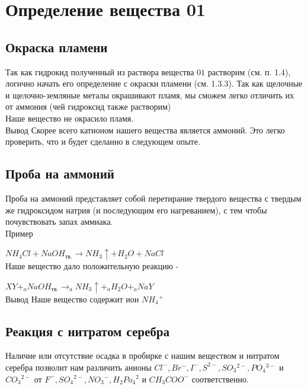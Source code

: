 \documentclass[a4paper,14pt,notitlepage,twoside]{article}
\begin{document}
    \newpage
    \section{Определение вещества 01}
        \subsection{Окраска пламени}
            Так как гидрокид полученный из раствора вещества $01$ растворим (см. п. 1.4),
            логично начать его определение с окраски пламени (см. 1.3.3). Так как щелочные
            и щелочно-земляные металы окрашивают пламя, мы сможем легко отличить их от 
            аммония (чей гидроксид также растворим)\\

            Наше вещество не окрасило пламя.\\

            Вывод \newline
            Скорее всего катионом нашего вещества является аммоний.
            Это легко проверить, что и будет сделанно в следующем опыте.
            
        \subsection{Проба на аммоний}
            Проба на аммоний представляет собой перетирание твердого вещества 
            с твердым же гидроксидом натрия (и последующим его нагреванием), с тем чтобы
            почувствовать запах аммиака.\\

            
            Пример

            $NH_4Cl+NaOH_{\mbox{тв.}}\to NH_3\uparrow + H_2O + NaCl$\\

            Наше вещество дало положительную реакцию -
            
            $XY + _aNaOH_{\mbox{тв.}}\to _aNH_3\uparrow + _aH_2O + _aNaY$\\
            
            Вывод\newline
            Наше вещество содержит ион $NH_4{}^+$

        \subsection{Реакция с нитратом серебра}
            Наличие или отсутствие осадка в пробирке с нашим веществом и нитратом серебра
            позволит нам различить анионы $Cl^-, Br^-, I^-,  S^{2-}, SO_3{}^{2-}, PO_4{}^{3-} $ и $ CO_3{}^{2-}$ 
            от $F^-, SO_4{}^{2-}, NO_3{}^-, H_2Po_4{}^2$ и $CH_3COO^-$ соответственно.\\
            
\end{document}
